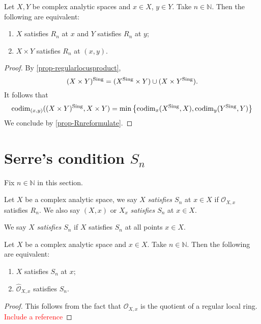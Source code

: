 \begin{proposition}\label{prop-Rnproduct}
    Let $X,Y$ be complex analytic spaces and $x\in X$, $y\in Y$. Take $n\in \mathbb{N}$. Then the following are equivalent:
    \begin{enumerate}
        \item $X$ satisfies $R_n$ at $x$ and $Y$ satisfies $R_n$ at $y$;
        \item $X\times Y$ satisfies $R_n$ at $(x,y)$.
    \end{enumerate}
\end{proposition}
\begin{proof}
    By \cref{prop-regularlocusproduct}, 
    \[
        (X\times Y)^{\operatorname{Sing}}=(X^{\operatorname{Sing}}\times Y)\cup (X\times Y^{\operatorname{Sing}}).  
    \]
    It follows that 
    \[
        \operatorname{codim}_{(x,y)}((X\times Y)^{\operatorname{Sing}},X\times Y)=  \min \left\{ \operatorname{codim}_x (X^{\operatorname{Sing}},X),\operatorname{codim}_y (Y^{\operatorname{Sing}},Y)\right\}
    \]
    We conclude by \cref{prop-Rnreformulate}.
\end{proof}

\section{Serre's condition \texorpdfstring{$S_n$}{Sn}}
Fix $n\in \mathbb{N}$ in this section.
\begin{definition}
    Let $X$ be a complex analytic space, we say $X$ \emph{satisfies $S_n$} at $x\in X$ if $\mathcal{O}_{X,x}$ satisfies $R_n$. We also say $(X,x)$ or $X_x$  \emph{satisfies $S_n$} at $x\in X$.

    We say $X$  \emph{satisfies $S_n$} if $X$ satisfies $S_n$ at all points $x\in X$. 
\end{definition}

\begin{proposition}\label{prop-Sncompletion}
    Let $X$ be a complex analytic space and $x\in X$. Take $n\in \mathbb{N}$. Then the following are equivalent:
    \begin{enumerate}
        \item $X$ satisfies $S_n$ at $x$;
        \item $\hat{\mathcal{O}}_{X,x}$ satisfies $S_n$.
    \end{enumerate}
\end{proposition}
\begin{proof}
    This follows from the fact that $\mathcal{O}_{X,x}$ is the quotient of a regular local ring. \textcolor{red}{Include a reference}
\end{proof}

